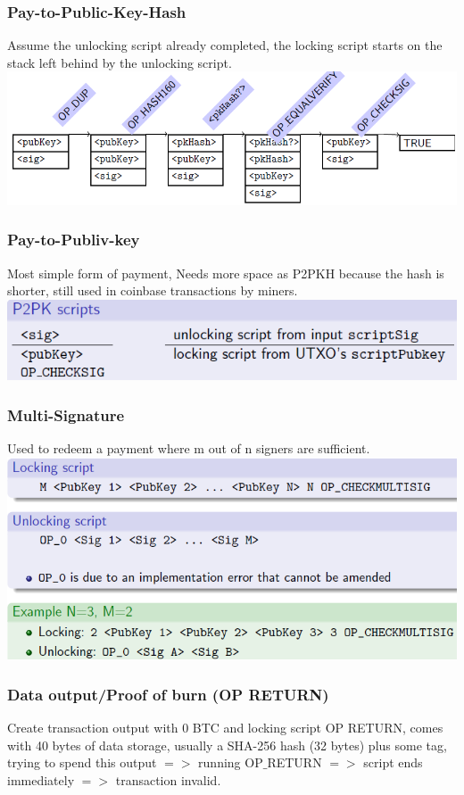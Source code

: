 \documentclass{article}
\begin{document}
\subsubsection{Pay-to-Public-Key-Hash}
Assume the unlocking script already completed, the locking script starts on the stack left behind by the unlocking script.\\
\includegraphics[scale=0.6]{22.png}
\subsubsection{Pay-to-Publiv-key}
Most simple form of payment, Needs more space as P2PKH because the hash is shorter, still used in coinbase transactions by miners.\\
\includegraphics[scale=0.6]{23.png}
\subsubsection{Multi-Signature}
Used to redeem a payment where m out of n signers are sufficient.\\
\includegraphics[scale=0.6]{24.png} 
\subsubsection{Data output/Proof of burn (OP RETURN)}
Create transaction output with 0 BTC and locking script OP RETURN, comes with 40 bytes of data storage, usually a SHA-256 hash (32 bytes) plus some tag, trying to spend this output $=>$ running OP$\_$RETURN $=>$ script ends immediately $=>$
transaction invalid.
\end{document}
